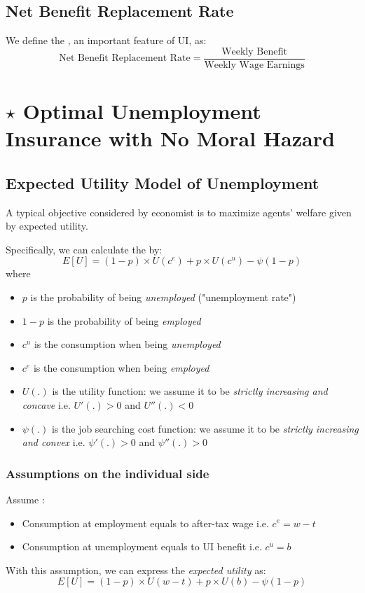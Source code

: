    \subsection{Net Benefit Replacement Rate}
        We define the , an important feature of UI, as:
        $$\text{Net\ Benefit\ Replacement\ Rate} = \frac{\text{Weekly\ Benefit}}{\text{Weekly\ Wage\ Earnings}}$$
        
\section{$\star$ Optimal Unemployment Insurance with No Moral Hazard}

    \subsection{Expected Utility Model of Unemployment}
        A typical objective considered by economist is to maximize agents' welfare given by expected utility.
        
        Specifically, we can calculate the  by:
        $$E[U] = (1-p)\times{U(c^e)} + p\times{U(c^u)} - \psi(1-p)$$
        where
        \begin{itemize}
            \item $p$ is the probability of being \emph{unemployed} ("unemployment rate")
            \item $1-p$ is the probability of being \emph{employed}
            \item $c^u$ is the consumption when being \emph{unemployed}
            \item $c^e$ is the consumption when being \emph{employed}
            \item $U(.)$ is the utility function: we assume it to be \emph{strictly increasing and concave} i.e. $U'(.)>0$ and $U''(.)<0$
            \item $\psi(.)$ is the job searching cost function: we assume it to be \emph{strictly increasing and convex} i.e. $\psi'(.)>0$ and $\psi''(.)>0$
        \end{itemize}
        
            \subsubsection{Assumptions on the individual side}
                Assume :
                \begin{itemize}
                    \item Consumption at employment equals to after-tax wage i.e. $c^e = w-t$
                    \item Consumption at unemployment equals to UI benefit i.e. $c^u = b$
                \end{itemize}
                With this assumption, we can express the \emph{expected utility} as:
                \begin{equation}
                    E[U] = (1-p)\times{U(w-t)} + p\times{U(b)} - \psi(1-p)
                    \label{eqn:ui_exp_utility}
                \end{equation}
                
